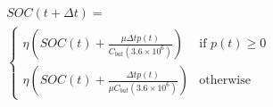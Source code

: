\begin{equation}
\begin{split}
	&SOC(t+\Delta t) =\\
	&\begin{cases}
		\eta \left(SOC(t) + \frac{\mu \Delta t p(t)}{C_{bat}(3.6\times10^6)}\right) &\text{if } p(t) \geq 0\\
		\eta \left(SOC(t) + \frac{\Delta t p(t)}{\mu C_{bat}(3.6\times10^6)}\right) &\text{otherwise}
	\end{cases}
\end{split}
	\label{ch2:equ:battery-model-equation}
\end{equation}